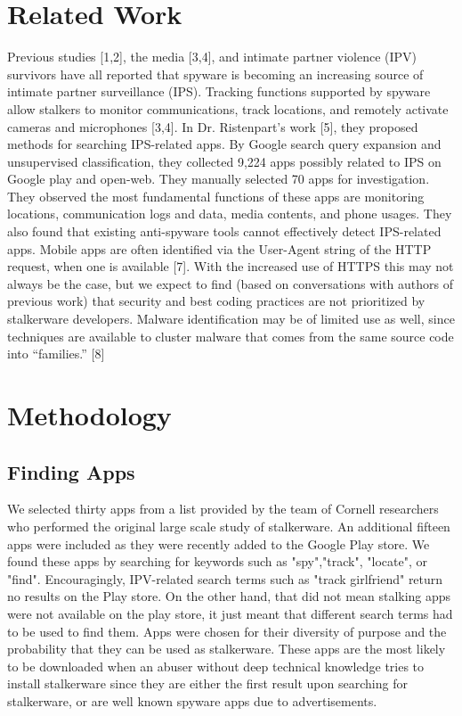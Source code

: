 \documentclass[acmtog]{acmart}
\begin{document}
\section{Related Work}
Previous studies [1,2], the media [3,4], and intimate partner violence (IPV) 
survivors have all reported that spyware is becoming an increasing source of 
intimate partner surveillance (IPS). Tracking functions supported by spyware 
allow stalkers to monitor communications, track locations, and remotely 
activate cameras and microphones [3,4]. In Dr. Ristenpart’s work [5], they 
proposed methods for searching IPS-related apps. By Google search query 
expansion and unsupervised classification, they collected 9,224 apps possibly 
related to IPS on Google play and open-web. They manually selected 70 apps for 
investigation. They observed the most fundamental functions of these apps are 
monitoring locations, communication logs and data, media contents, and phone 
usages. They also found that existing anti-spyware tools cannot effectively 
detect IPS-related apps.
Mobile apps are often identified via the User-Agent string of the HTTP request, 
when one is available [7]. With the increased use of HTTPS this may not always 
be the case, but we expect to find (based on conversations with authors of 
previous work) that security and best coding practices are not prioritized by 
stalkerware developers. Malware identification may be of limited use as well, 
since techniques are available to cluster malware that comes from the same 
source code into “families.” [8]

\section{Methodology}
\subsection{Finding Apps}
We selected thirty apps from a list provided by the team of Cornell researchers 
who performed the original large scale study of 
stalkerware\cite{chatterjee_spyware_2018}. An 
additional fifteen apps were included as they were recently added to the Google 
Play store. We found these apps by searching for keywords such as 
"spy","track", "locate", or "find". Encouragingly, IPV-related search terms 
such as "track girlfriend" return no results on the Play store. On the other 
hand, that did not mean stalking apps were not available on the play store, it 
just meant that different search terms had to be used to find them. Apps were 
chosen for their diversity of purpose and the probability that 
they can be used as stalkerware. These apps are the most likely to be 
downloaded when an abuser without deep technical knowledge tries to install 
stalkerware since they are either the first result upon searching for 
stalkerware, or are well known spyware apps due to advertisements.
\end{document}
